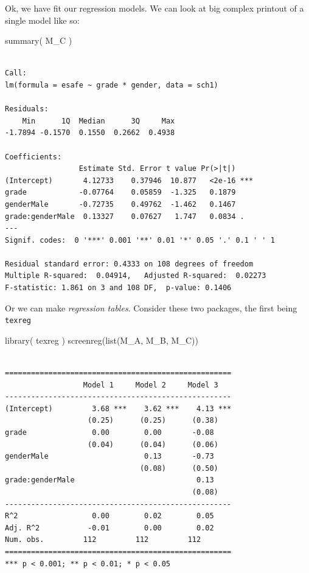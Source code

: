 \documentclass[
  letterpaper,
  DIV=11,
  numbers=noendperiod]{scrreprt}
\newenvironment{Shaded}{}{}
\newcommand{\FunctionTok}[1]{\textcolor[rgb]{0.02,0.16,0.49}{#1}}
\newcommand{\NormalTok}[1]{#1}
\begin{document}
Ok, we have fit our regression models. We can look at big complex
printout of a single model like so:

\begin{Shaded}
\begin{Highlighting}[]
\FunctionTok{summary}\NormalTok{( M\_C )}
\end{Highlighting}
\end{Shaded}

\begin{verbatim}

Call:
lm(formula = esafe ~ grade * gender, data = sch1)

Residuals:
    Min      1Q  Median      3Q     Max 
-1.7894 -0.1570  0.1550  0.2662  0.4938 

Coefficients:
                 Estimate Std. Error t value Pr(>|t|)    
(Intercept)       4.12733    0.37946  10.877   <2e-16 ***
grade            -0.07764    0.05859  -1.325   0.1879    
genderMale       -0.72735    0.49762  -1.462   0.1467    
grade:genderMale  0.13327    0.07627   1.747   0.0834 .  
---
Signif. codes:  0 '***' 0.001 '**' 0.01 '*' 0.05 '.' 0.1 ' ' 1

Residual standard error: 0.4333 on 108 degrees of freedom
Multiple R-squared:  0.04914,   Adjusted R-squared:  0.02273 
F-statistic: 1.861 on 3 and 108 DF,  p-value: 0.1406
\end{verbatim}

Or we can make \emph{regression tables}. Consider these two packages,
the first being \texttt{texreg}

\begin{Shaded}
\begin{Highlighting}[]
\FunctionTok{library}\NormalTok{( texreg )}
\FunctionTok{screenreg}\NormalTok{(}\FunctionTok{list}\NormalTok{(M\_A, M\_B, M\_C))}
\end{Highlighting}
\end{Shaded}

\begin{verbatim}

====================================================
                  Model 1     Model 2     Model 3   
----------------------------------------------------
(Intercept)         3.68 ***    3.62 ***    4.13 ***
                   (0.25)      (0.25)      (0.38)   
grade               0.00        0.00       -0.08    
                   (0.04)      (0.04)      (0.06)   
genderMale                      0.13       -0.73    
                               (0.08)      (0.50)   
grade:genderMale                            0.13    
                                           (0.08)   
----------------------------------------------------
R^2                 0.00        0.02        0.05    
Adj. R^2           -0.01        0.00        0.02    
Num. obs.         112         112         112       
====================================================
*** p < 0.001; ** p < 0.01; * p < 0.05
\end{verbatim}
\end{document}
